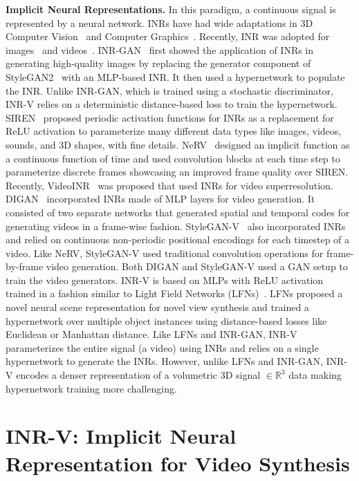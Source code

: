 \documentclass[10pt]{article} \usepackage[accepted]{tmlr}
\begin{document}
\textbf{Implicit Neural Representations.} In this paradigm, a continuous signal is represented by a neural network. 
INRs have had wide adaptations in 3D Computer Vision~\cite{deepsdf, inr1, inr2, occunet, lfns, nerf} and Computer Graphics~\cite{adnerf, dfanerf}. Recently, INR was adopted for images~\cite{inr-gan} and videos~\cite{nerv, siren, digan, videoinr}. INR-GAN~\cite{inr-gan} first showed the application of INRs in generating high-quality images by replacing the generator component of StyleGAN2~\cite{stylegan2} with an MLP-based INR. It then used a hypernetwork to populate the INR. Unlike INR-GAN, which is trained using a stochastic discriminator, INR-V relies on a deterministic distance-based loss to train the hypernetwork. SIREN~\cite{siren} proposed periodic activation functions for INRs
as a replacement for ReLU activation to parameterize many different data types like images, videos, sounds, and $3$D shapes, with fine details. NeRV~\cite{nerv} designed an implicit function as a continuous function of time and used convolution blocks at each time step to parameterize discrete frames showcasing an improved frame quality over SIREN. Recently, VideoINR~\cite{videoinr} was proposed that used INRs for video superresolution. DIGAN~\cite{digan} incorporated INRs made of MLP layers for video generation. It consisted of two separate networks that generated spatial and temporal codes for generating videos in a frame-wise fashion. 
StyleGAN-V~\cite{stylegan-v} also incorporated INRs and relied on continuous non-periodic positional encodings for each timestep of a video.
Like NeRV, StyleGAN-V used traditional convolution operations for frame-by-frame video generation. Both DIGAN and StyleGAN-V used a GAN setup to train the video generators. INR-V is based on MLPs with ReLU activation trained in a fashion similar to Light Field Networks (LFNs)~\cite{lfns}. LFNs proposed a novel neural scene representation for novel view synthesis and trained a hypernetwork over multiple object instances using distance-based losses like Euclidean or Manhattan distance. Like LFNs and INR-GAN, INR-V parameterizes the entire signal (a video) using INRs and relies on a single hypernetwork to generate the INRs. 
However, unlike LFNs and INR-GAN, INR-V encodes a denser representation of a volumetric $3$D signal $\in \mathbb{R}^3$ data making hypernetwork training more challenging.

\section{INR-V: Implicit Neural Representation for Video Synthesis}
\end{document}
